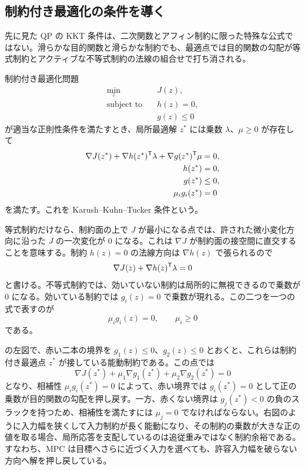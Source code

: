 \subsection{制約付き最適化の条件を導く}

先に見た QP の KKT 条件は、二次関数とアフィン制約に限った特殊な公式ではない。滑らかな目的関数と滑らかな制約でも、最適点では目的関数の勾配が等式制約とアクティブな不等式制約の法線の組合せで打ち消される。

\begin{theorem}[KKT 条件]
制約付き最適化問題
\begin{align}
  \min_z\quad &J(z),\\
  \text{subject to}\quad &h(z)=0,\\
  &g(z)\le0
\end{align}
が適当な正則性条件を満たすとき、局所最適解 $z^*$ には乗数 $\lambda$、$\mu\ge0$ が存在して
\begin{align}
  \nabla J(z^*)+\nabla h(z^*)^{\mathsf{T}}\lambda+\nabla g(z^*)^{\mathsf{T}}\mu&=0,\\
  h(z^*)&=0,\\
  g(z^*)&\le0,\\
  \mu_i g_i(z^*)&=0
\end{align}
を満たす。これを Karush--Kuhn--Tucker 条件という。
\end{theorem}

\begin{derivation}
等式制約だけなら、制約面の上で $J$ が最小になる点では、許された微小変化方向に沿った $J$ の一次変化が 0 になる。これは $\nabla J$ が制約面の接空間に直交することを意味する。制約 $h(z)=0$ の法線方向は $\nabla h(z)$ で張られるので
\begin{equation}
  \nabla J(z)+\nabla h(z)^{\mathsf{T}}\lambda=0
\end{equation}
と書ける。不等式制約では、効いていない制約は局所的に無視できるので乗数が 0 になる。効いている制約では $g_i(z)=0$ で乗数が現れる。この二つを一つの式で表すのが
\begin{equation}
  \mu_i g_i(z)=0,
  \qquad
  \mu_i\ge0
\end{equation}
である。
\end{derivation}

 の左図で、赤い二本の境界を $g_1(z)\le0$、$g_2(z)\le0$ とおくと、これらは制約付き最適点 $z^*$ が接している能動制約である。この点では
\begin{equation}
  \nabla J(z^*)+\mu_1\nabla g_1(z^*)+\mu_2\nabla g_2(z^*)=0
\end{equation}
となり、相補性 $\mu_i g_i(z^*)=0$ によって、赤い境界では $g_i(z^*)=0$ として正の乗数が目的関数の勾配を押し戻す。一方、赤くない境界は $g_j(z^*)<0$ の負のスラックを持つため、相補性を満たすには $\mu_j=0$ でなければならない。右図のように入力幅を狭くして入力制約が長く能動になり、その制約の乗数が大きな正の値を取る場合、局所応答を支配しているのは追従重みではなく制約余裕である。すなわち、MPC は目標へさらに近づく入力を選べても、許容入力幅を破らない方向へ解を押し戻している。


